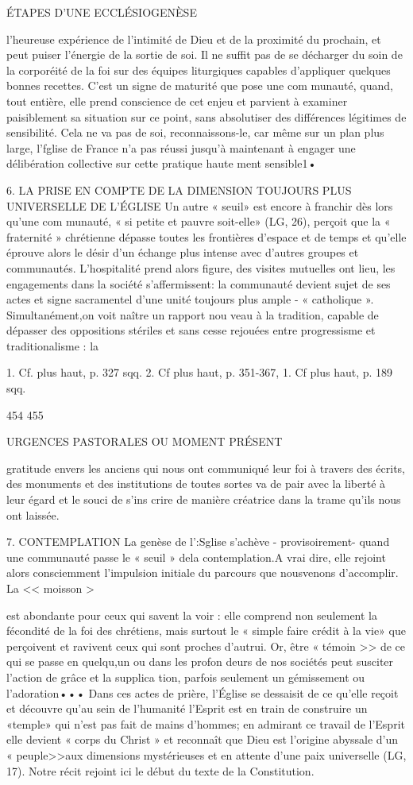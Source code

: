 {{ÉTAPES D'UNE ECCLÉSIOGENÈSE

l'heureuse expérience de l'intimité de Dieu et de la proximité du prochain, et peut puiser l'énergie de la sortie de soi.
Il ne suffit pas de se décharger du soin de la corporéité de la foi sur des équipes liturgiques capables d'appliquer quelques bonnes recettes. C'est un signe de maturité que pose une com­ munauté, quand, tout entière, elle prend conscience de cet enjeu et parvient à examiner paisiblement sa situation sur ce point, sans absolutiser des différences légitimes de sensibilité. Cela ne va pas de soi, reconnaissons-le, car même sur un plan plus large, l'fglise de France n'a pas réussi jusqu'à maintenant à engager une délibération collective sur cette pratique haute­ ment sensible1•

6.	LA PRISE EN COMPTE DE LA DIMENSION TOUJOURS PLUS UNIVERSELLE DE L'ÉGLISE
Un autre « seuil» est encore à franchir dès lors qu'une com­ munauté, « si petite et pauvre soit-elle» (LG, 26), perçoit que la « fraternité » chrétienne dépasse toutes les frontières d'espace et de temps et qu'elle éprouve alors le désir d'un échange plus intense avec d'autres groupes et communautés. L'hospitalité prend alors figure, des visites mutuelles ont lieu, les engagements dans la société s'affermissent: la communauté devient sujet de ses actes et signe sacramentel d'une unité toujours plus ample
-		« catholique ». Simultanément,on voit naître un rapport nou­ veau à la tradition, capable de dépasser des oppositions stériles et sans cesse rejouées entre progressisme et traditionalisme : la
 

1.	Cf. plus haut, p. 327 sqq.
2.	Cf plus haut, p. 351-367,	1. Cf plus haut, p. 189 sqq.

454	455
 
URGENCES PASTORALES OU MOMENT PRÉSENT

gratitude envers les anciens qui nous ont communiqué leur foi à travers des écrits, des monuments et des institutions de toutes sortes va de pair avec la liberté à leur égard et le souci de s'ins­ crire de manière créatrice dans la trame qu'ils nous ont laissée.

7.	CONTEMPLATION
La genèse de l':Sglise s'achève -	provisoirement-	quand une communauté passe le « seuil » dela contemplation.A vrai dire, elle rejoint alors consciemment l'impulsion initiale du parcours que nousvenons d'accomplir. La << moisson >} est abondante pour ceux qui savent la voir : elle comprend non seulement la fécondité de
la foi des chrétiens, mais surtout le « simple faire crédit à la vie» que perçoivent et ravivent ceux qui sont proches d'autrui. Or, être
« témoin >> de ce qui se passe en quelqu,un ou dans les profon­ deurs de nos sociétés peut susciter l'action de grâce et la supplica­ tion, parfois seulement un gémissement ou l'adoration••• Dans ces actes de prière, l'Église se dessaisit de ce qu'elle reçoit et découvre qu'au sein de l'humanité l'Esprit est en train de construire un
«temple» qui n'est pas fait de mains d'hommes; en admirant ce travail de l'Esprit elle devient « corps du Christ » et reconnaît que Dieu est l'origine abyssale d'un « peuple>>aux dimensions mystérieuses et en attente d'une paix universelle (LG, 17). Notre récit rejoint ici le début du texte de la Constitution.

}
